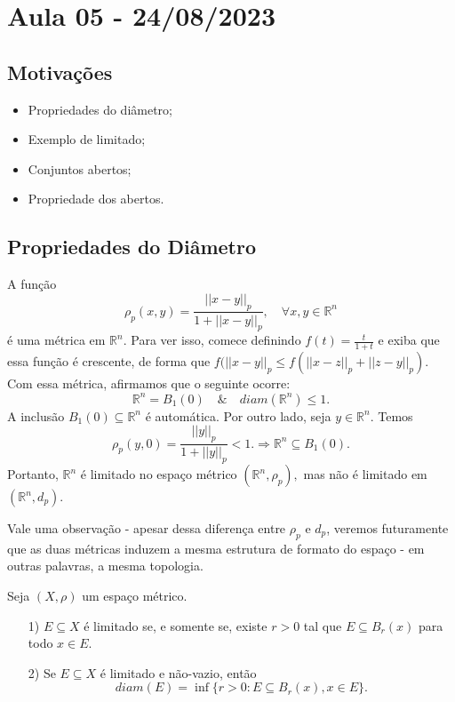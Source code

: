 \documentclass[MetricSpaces/metric_notes.tex]{subfiles}
\begin{document}
\section{Aula 05 - 24/08/2023}
\subsection{Motivações}
\begin{itemize}
	\item Propriedades do diâmetro;
	\item Exemplo de limitado;
	\item Conjuntos abertos;
	\item Propriedade dos abertos.
\end{itemize}
\subsection{Propriedades do Diâmetro}
\begin{example}
	A função
	\[
		\rho_{p}(x,y) = \frac{||x-y||_{p}}{1+||x-y||_{p}},\quad \forall x, y\in \mathbb{R}^{n}
	\]
	é uma métrica em \(\mathbb{R}^{n}\). Para ver isso, comece definindo \(f(t) = \frac{t}{1+t}\) e exiba que essa função é
	crescente, de forma que \(f(||x-y||_{p}\leq f(||x-z||_{p}+||z-y||_{p})\). Com essa métrica, afirmamos que o seguinte ocorre:
	\[
		\mathbb{R}^{n} = B_{1}(0)\quad\&\quad diam(\mathbb{R}^{n})\leq 1.
	\]
	A inclusão \(B_{1}(0)\subseteq{\mathbb{R}^{n}}\) é automática. Por outro lado, seja \(y\in \mathbb{R}^{n}.\) Temos
	\[
		\rho_{p}(y, 0) = \frac{||y||_{p}}{1 + ||y||_{p}} < 1. \Rightarrow \mathbb{R}^{n}\subseteq{B_{1}(0)}.
	\]
	Portanto, \(\mathbb{R}^{n}\) é limitado no espaço métrico \((\mathbb{R}^{n}, \rho_{p}),\) mas não é limitado em \((\mathbb{R}^{n}, d_{p})\).
\end{example}
Vale uma observação - apesar dessa diferença entre \(\rho_{p}\) e \(d_{p}\), veremos futuramente que as duas métricas induzem a mesma
estrutura de formato do espaço - em outras palavras, a mesma topologia.
\begin{prop*}
	Seja \((X, \rho )\) um espaço métrico.
	\begin{itemize}
		\item[1)] \(E\subseteq{X}\) é limitado se, e somente se, existe \(r>0\) tal que \(E\subseteq{B_{r}(x)}\) para todo \(x\in E\).
		\item[2)] Se \(E\subseteq{X}\) é limitado e não-vazio, então
		      \[
			      diam(E) = \inf\{r > 0: E \subseteq{B_{r}(x)}, x \in E\}.
		      \]
	\end{itemize}
\end{prop*}
\end{document}
